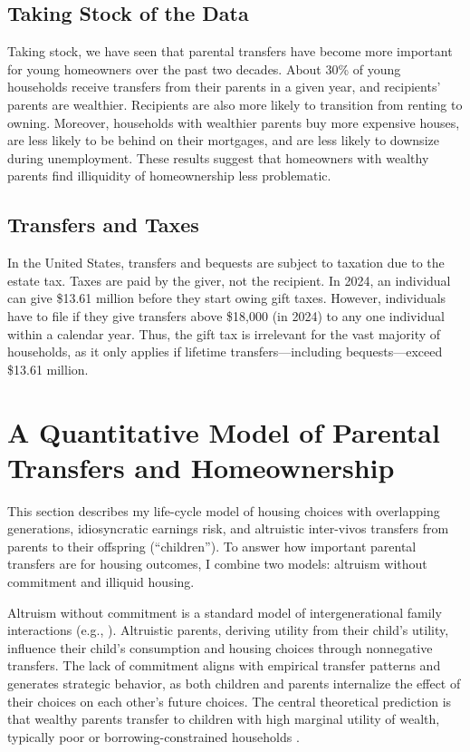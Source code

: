 \documentclass[12pt]{article}
\begin{document}
\subsection{Taking Stock of the Data}
Taking stock, we have seen that parental transfers have become more important for young homeowners over the past two decades. About 30\% of young households receive transfers from their parents in a given year, and recipients' parents are wealthier. Recipients are also more likely to transition from renting to owning. Moreover, households with wealthier parents buy more expensive houses, are less likely to be behind on their mortgages, and are less likely to downsize during unemployment. These results suggest that homeowners with wealthy parents find illiquidity of homeownership less problematic. 

\subsection{Transfers and Taxes}
In the United States, transfers and bequests are subject to taxation due to the estate tax. Taxes are paid by the giver, not the recipient. In 2024, an individual can give \$13.61 million before they start owing gift taxes. However, individuals have to file if they give transfers above \$18,000 (in 2024) to any one individual within a calendar year. Thus, the gift tax is irrelevant for the vast majority of households, as it only applies if lifetime transfers---including bequests---exceed \$13.61 million.


\section{A Quantitative Model of Parental Transfers and Homeownership}\label{sec:model}
This section describes my life-cycle model of housing choices with overlapping generations, idiosyncratic earnings risk, and altruistic inter-vivos transfers from parents to their offspring (``children''). To answer how important parental transfers are for housing outcomes, I combine two models: altruism without commitment and illiquid housing. 

Altruism without commitment is a standard model of intergenerational family interactions (e.g., \cite{Altonji1997a,Barczyk2018}). Altruistic parents, deriving utility from their child's utility, influence their child's consumption and housing choices through nonnegative transfers. The lack of commitment aligns with empirical transfer patterns and generates strategic behavior, as both children and parents internalize the effect of their choices on each other's future choices. The central theoretical prediction is that wealthy parents transfer to children with high marginal utility of wealth, typically poor or borrowing-constrained households \citep{Chu2020,Barczyk2020}.
\end{document}
